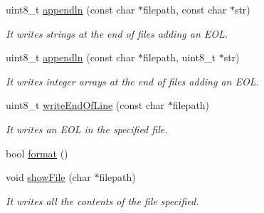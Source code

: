 \begin{DoxyCompactItemize}
uint8\+\_\+t \hyperlink{class_wasp_s_d_ab006d3cef31611464459cad157a78672}{appendln} (const char $\ast$filepath, const char $\ast$str)
\begin{DoxyCompactList}\small\item\em It writes strings at the end of files adding an E\+OL. \end{DoxyCompactList}\item 
uint8\+\_\+t \hyperlink{class_wasp_s_d_ac964ae8fcfb40ed2dd22ef896639e39f}{appendln} (const char $\ast$filepath, uint8\+\_\+t $\ast$str)
\begin{DoxyCompactList}\small\item\em It writes integer arrays at the end of files adding an E\+OL. \end{DoxyCompactList}\item 
uint8\+\_\+t \hyperlink{class_wasp_s_d_a02da5f3b0d7ad6d163d6b208ad669b7d}{write\+End\+Of\+Line} (const char $\ast$filepath)
\begin{DoxyCompactList}\small\item\em It writes an E\+OL in the specified file. \end{DoxyCompactList}\item 
bool \hyperlink{class_wasp_s_d_a53e73f2b8ea28837a740ddfc72b46221}{format} ()
\item 
void \hyperlink{class_wasp_s_d_a6dcad9007022263cb080e7ac72d1ea0a}{show\+File} (char $\ast$filepath)
\begin{DoxyCompactList}\small\item\em It writes all the contents of the file specified. \end{DoxyCompactList}\end{DoxyCompactItemize}
